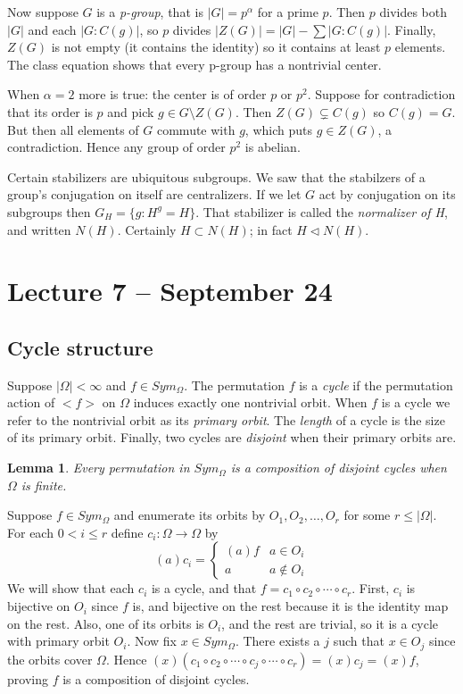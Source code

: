 \documentclass[letterpaper]{article}
\newtheorem{lemma}[theorem]{Lemma}
\newenvironment{proof}[1][Proof]{\begin{trivlist}
\item[\hskip \labelsep {\bfseries #1}]}{\end{trivlist}}
\begin{document}
Now suppose $G$ is a \emph{p-group}, that is $|G| = p^\alpha$ for a prime $p$. Then $p$ divides both $|G|$ and each $|G \colon C(g)|$, so $p$ divides $|Z(G)| = |G| - \sum |G \colon C(g)|$. Finally, $Z(G)$ is not empty (it contains the identity) so it contains at least $p$ elements. The class equation shows that every p-group has a nontrivial center.

When $\alpha = 2$ more is true: the center is of order $p$ or $p^2$. Suppose for contradiction that its order is $p$ and pick $g \in G \setminus Z(G)$. Then $Z(G) \subsetneq C(g)$ so $C(g) = G$. But then all elements of $G$ commute with $g$, which puts $g \in Z(G)$, a contradiction. Hence any group of order $p^2$ is abelian.

Certain stabilizers are ubiquitous subgroups. We saw that the stabilzers of a group's conjugation on itself are centralizers. If we let $G$ act by conjugation on its subgroups then $G_H = \{g\colon H^g = H\}$. That stabilizer is called the \emph{normalizer of H}, and written $N(H)$. Certainly $H \subset N(H)$; in fact $H \lhd N(H)$.

\section{Lecture 7 -- September 24}

\subsection{Cycle structure}

Suppose $|\Omega| < \infty$ and $f \in Sym_\Omega$. The permutation $f$ is a \emph{cycle} if the permutation action of ${<}f{>}$ on $\Omega$ induces exactly one nontrivial orbit. When $f$ is a cycle we refer to the nontrivial orbit as its \emph{primary orbit}. The \emph{length} of a cycle is the size of its primary orbit. Finally, two cycles are \emph{disjoint} when their primary orbits are.

\begin{lemma}
Every permutation in $Sym_\Omega$ is a composition of disjoint cycles when $\Omega$ is finite.
\end{lemma}
\begin{proof}
Suppose $f \in Sym_\Omega$ and enumerate its orbits by $O_1, O_2, \ldots, O_r$ for some $r \leq |\Omega|$. For each $0 < i \leq r$ define $c_i \colon \Omega \rightarrow \Omega$ by
\[(a)c_i = \begin{cases}
(a)f & a \in O_i \\
a & a \not \in O_i
\end{cases}
\]
We will show that each $c_i$ is a cycle, and that $f = c_1 \circ c_2 \circ \cdots \circ c_r$. First, $c_i$ is bijective on $O_i$ since $f$ is, and bijective on the rest because it is the identity map on the rest. Also, one of its orbits is $O_i$, and the rest are trivial, so it is a cycle with primary orbit $O_i$. Now fix $x \in Sym_\Omega$. There exists a $j$ such that $x \in O_j$ since the orbits cover $\Omega$. Hence $(x)(c_1 \circ c_2 \circ \cdots \circ c_j \circ \cdots \circ c_r) = (x)c_j = (x)f$, proving $f$ is a composition of disjoint cycles.
\end{proof}
\end{document}
